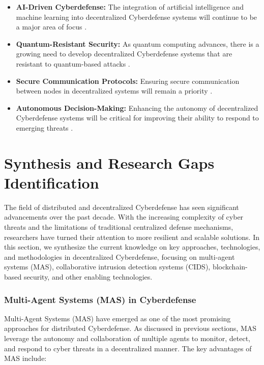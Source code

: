 \begin{itemize}
    \item \textbf{AI-Driven Cyberdefense:} The integration of artificial intelligence and machine learning into decentralized Cyberdefense systems will continue to be a major area of focus \cite{Kaur2023}.

    \item \textbf{Quantum-Resistant Security:} As quantum computing advances, there is a growing need to develop decentralized Cyberdefense systems that are resistant to quantum-based attacks \cite{Bernstein2017}.

    \item \textbf{Secure Communication Protocols:} Ensuring secure communication between nodes in decentralized systems will remain a priority \cite{Granjal2015}.

    \item \textbf{Autonomous Decision-Making:} Enhancing the autonomy of decentralized Cyberdefense systems will be critical for improving their ability to respond to emerging threats \cite{Nguyen2019}.
\end{itemize}



\section{Synthesis and Research Gaps Identification}

The field of distributed and decentralized Cyberdefense has seen significant advancements over the past decade. With the increasing complexity of cyber threats and the limitations of traditional centralized defense mechanisms, researchers have turned their attention to more resilient and scalable solutions. In this section, we synthesize the current knowledge on key approaches, technologies, and methodologies in decentralized Cyberdefense, focusing on multi-agent systems (MAS), collaborative intrusion detection systems (CIDS), blockchain-based security, and other enabling technologies.

\subsubsection{Multi-Agent Systems (MAS) in Cyberdefense}

Multi-Agent Systems (MAS) have emerged as one of the most promising approaches for distributed Cyberdefense. As discussed in previous sections, MAS leverage the autonomy and collaboration of multiple agents to monitor, detect, and respond to cyber threats in a decentralized manner. The key advantages of MAS include:

